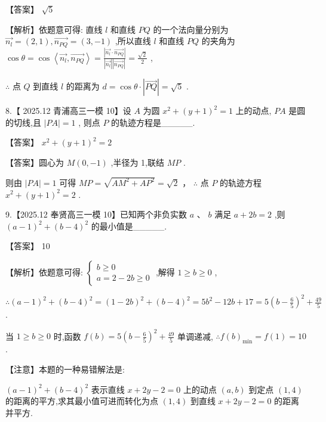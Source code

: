 \documentclass[10pt]{article}
\begin{document}
【答案】 \(\sqrt{5}\)

【解析】依题意可得: 直线 \(l\) 和直线 \({PQ}\) 的一个法向量分别为 \(\overrightarrow{{n}_{l}} = \left( {2,1}\right) ,\overrightarrow{{n}_{PQ}} = \left( {3, - 1}\right)\) ,所以直线 \(l\) 和直线 \({PQ}\) 的夹角为 \(\cos \theta  = \cos \left\langle  {\overrightarrow{{n}_{l}},\overrightarrow{{n}_{PQ}}}\right\rangle   = \frac{\left| \overrightarrow{{n}_{l}} \cdot  \overrightarrow{{n}_{PQ}}\right| }{\left| \overrightarrow{{n}_{l}}\right| \left| \overrightarrow{{n}_{PQ}}\right| } = \frac{\sqrt{2}}{2}\) ,

\(\therefore\) 点 \(Q\) 到直线 \(l\) 的距离为 \(d = \cos \theta  \cdot  \left| \overrightarrow{PQ}\right|  = \sqrt{5}\) .

8.【 2025.12 青浦高三一模 10】设 \(A\) 为圆 \({x}^{2} + {\left( y + 1\right) }^{2} = 1\) 上的动点, \({PA}\) 是圆的切线,且 \(\left| {PA}\right|  = 1\) , 则点 \(P\) 的轨迹方程是\_\_\_\_\_.

【答案】 \({x}^{2} + {\left( y + 1\right) }^{2} = 2\)

【答案】圆心为 \(M\left( {0, - 1}\right)\) ,半径为 1,联结 \({MP}\) .

则由 \(\left| {PA}\right|  = 1\) 可得 \({MP} = \sqrt{A{M}^{2} + A{P}^{2}} = \sqrt{2}\) ， \(\therefore\) 点 \(P\) 的轨迹方程 \({x}^{2} + {\left( y + 1\right) }^{2} = 2\) .

9.【2025.12 奉贤高三一模 10】已知两个非负实数 \(a\text{ 、 }b\) 满足 \(a + {2b} = 2\) ,则 \({\left( a - 1\right) }^{2} + {\left( b - 4\right) }^{2}\) 的最小值是\_\_\_\_\_.

【答案】 10

【解析】依题意可得: \(\left\{  \begin{array}{l} b \geq  0 \\  a = 2 - {2b} \geq  0 \end{array}\right.\) ,解得 \(1 \geq  b \geq  0\) ,

\(\therefore {\left( a - 1\right) }^{2} + {\left( b - 4\right) }^{2} = {\left( 1 - 2b\right) }^{2} + {\left( b - 4\right) }^{2} = 5{b}^{2} - {12b} + {17} = 5{\left( b - \frac{6}{5}\right) }^{2} + \frac{49}{5}\) .

当 \(1 \geq  b \geq  0\) 时,函数 \(f\left( b\right)  = 5{\left( b - \frac{6}{5}\right) }^{2} + \frac{49}{5}\) 单调递减, \(\therefore f{\left( b\right) }_{\min } = f\left( 1\right)  = {10}\) .

【注意】本题的一种易错解法是:

\({\left( a - 1\right) }^{2} + {\left( b - 4\right) }^{2}\) 表示直线 \(x + {2y} - 2 = 0\) 上的动点 \(\left( {a,b}\right)\) 到定点 \(\left( {1,4}\right)\) 的距离的平方,求其最小值可进而转化为点 \(\left( {1,4}\right)\) 到直线 \(x + {2y} - 2 = 0\) 的距离并平方.
\end{document}
